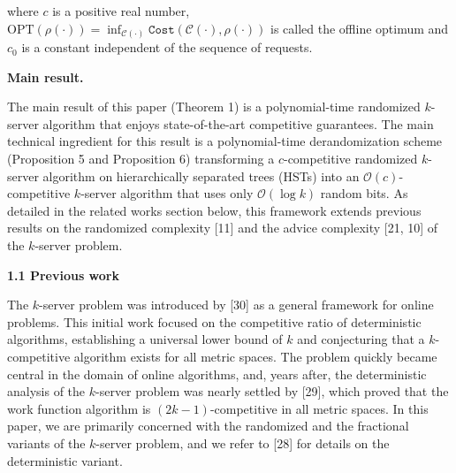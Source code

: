 where $c$ is a positive real number, $\text{OPT}(\rho(\cdot))=\inf_{\mathcal{C}(\cdot)}{\texttt{Cost}}(\mathcal{C}(\cdot),\rho(\cdot))$ is called the offline optimum and $c_{0}$ is a constant independent of the sequence of requests.\par




\par\medskip\noindent\textbf{Main result.}\par




The main result of this paper (Theorem 1) is a polynomial-time randomized $k$-server algorithm that enjoys state-of-the-art competitive guarantees. The main technical ingredient for this result is a polynomial-time derandomization scheme (Proposition 5 and Proposition 6) transforming a $c$-competitive randomized $k$-server algorithm on hierarchically separated trees (HSTs) into an $\mathcal{O}(c)$-competitive $k$-server algorithm that uses only $\mathcal{O}(\log k)$ random bits. As detailed in the related works section below, this framework extends previous results on the randomized complexity [11] and the advice complexity [21, 10] of the $k$-server problem.\par





\par\medskip\noindent\textbf{
1.1 Previous work}\par




The $k$-server problem was introduced by [30] as a general framework for online problems.
This initial work focused on the competitive ratio of deterministic algorithms, establishing a universal lower bound of $k$ and conjecturing that a $k$-competitive algorithm exists for all metric spaces. The problem quickly became central in the domain of online algorithms, and, years after, the deterministic analysis of the $k$-server problem was nearly settled by [29], which proved that the work function algorithm is $(2k-1)$-competitive in all metric spaces. In this paper, we are primarily concerned with the randomized and the fractional variants of the $k$-server problem, and we refer to [28] for details on the deterministic variant.\par




